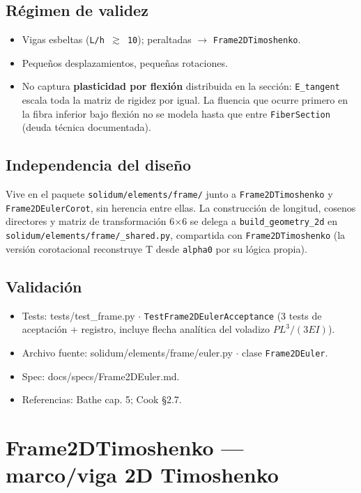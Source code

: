 \documentclass[11pt,letterpaper,oneside]{report}
\begin{document}
\subsection{Régimen de validez}
\begin{itemize}
  \item Vigas esbeltas (\texttt{L/h \ensuremath{\gtrsim} 10}); peraltadas \ensuremath{\to} \texttt{Frame2DTimoshenko}.
  \item Pequeños desplazamientos, pequeñas rotaciones.
  \item No captura \textbf{plasticidad por flexión} distribuida en la sección: \texttt{E\_tangent} escala toda la matriz de rigidez por igual. La fluencia que ocurre primero en la fibra inferior bajo flexión no se modela hasta que entre \texttt{FiberSection} (deuda técnica documentada).
\end{itemize}

\subsection{Independencia del diseño}
Vive en el paquete \texttt{solidum/elements/frame/} junto a \texttt{Frame2DTimoshenko} y \texttt{Frame2DEulerCorot}, sin herencia entre ellas. La construcción de longitud, cosenos directores y matriz de transformación 6\ensuremath{\times}6 se delega a \texttt{build\_geometry\_2d} en \texttt{solidum/elements/frame/\_shared.py}, compartida con \texttt{Frame2DTimoshenko} (la versión corotacional reconstruye T desde \texttt{alpha0} por su lógica propia).

\subsection{Validación}
\begin{itemize}
  \item Tests: tests/test\_frame.py \ensuremath{\cdot} \texttt{TestFrame2DEulerAcceptance} (3 tests de aceptación + registro, incluye flecha analítica del voladizo $PL^3/(3EI)$).
  \item Archivo fuente: solidum/elements/frame/euler.py \ensuremath{\cdot} clase \texttt{Frame2DEuler}.
  \item Spec: docs/specs/Frame2DEuler.md.
  \item Referencias: Bathe cap. 5; Cook §2.7.
\end{itemize}


\section{Frame2DTimoshenko --- marco/viga 2D Timoshenko}
\end{document}
